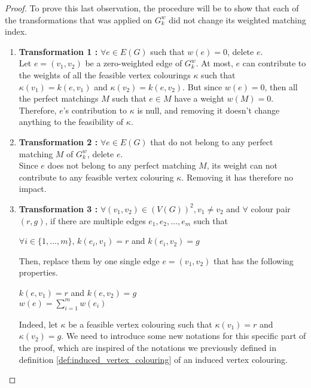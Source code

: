 \begin{proof}
    To prove this last observation, the procedure will be to show that each of the transformations that was applied on $G_k^w$ did not change its weighted matching index.

    \begin{enumerate}
        \item \textbf{Transformation 1 :} $\forall e \in E(G)$ such that $w(e) = 0$, delete $e$. \\
            Let $e = (v_1, v_2)$ be a zero-weighted edge of $G_k^w$. At most, $e$ can contribute to the weights of all the feasible vertex colourings $\kappa$ such that $\kappa(v_1) = k(e, v_1)$ and $\kappa(v_2) = k(e, v_2)$. But since $w(e) = 0$, then all the perfect matchings $M$ such that $e \in M$ have a weight $w(M) = 0$. Therefore, $e$'s contribution to $\kappa$ is null, and removing it doesn't change anything to the feasibility of $\kappa$.

        \item \textbf{Transformation 2 :} $\forall e \in E(G)$ that do not belong to any perfect matching $M$ of $G_k^w$, delete $e$. \\
            Since $e$ does not belong to any perfect matching $M$, its weight can not contribute to any feasible vertex colouring $\kappa$. Removing it has therefore no impact.

        \item \textbf{Transformation 3 :} $\forall (v_1, v_2) \in (V(G))^2, v_1 \neq v_2$ and $\forall$ colour pair $(r, g)$, if there are multiple edges $e_1, e_2, \dots, e_m$ such that 
        \begin{center}
            $\forall i \in \{1, \dots, m\}$, $k(e_i, v_1) = r$ and $k(e_i, v_2) = g$
        \end{center}
        Then, replace them by one single edge $e = (v_1, v_2)$ that has the following properties.
        \begin{center}
            $k(e, v_1) = r$ and $k(e, v_2) = g$ \\
            $w(e) = \sum\limits_{i = 1}^m w(e_i)$
        \end{center}

            Indeed, let $\kappa$ be a feasible vertex colouring such that $\kappa(v_1) = r$ and $\kappa(v_2) = g$. We need to introduce some new notations for this specific part of the proof, which are inspired of the notations we previously defined in definition \ref{def:induced_vertex_colouring} of an induced vertex colouring.


\end{enumerate}
\end{proof}

